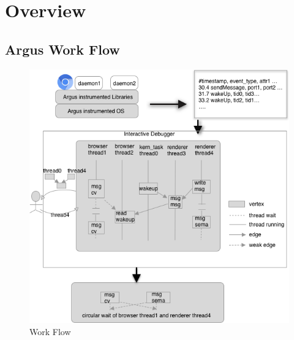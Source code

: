 \section{Overview}\label{sec:overview}

\subsection{Argus Work Flow}
\begin{figure}[tb]
    \centering
	\includegraphics[width=\columnwidth]{./figures/Argus_overview.png}
    \caption{\xxx Work Flow}
    \label{fig:argus-overview}
\end{figure}

